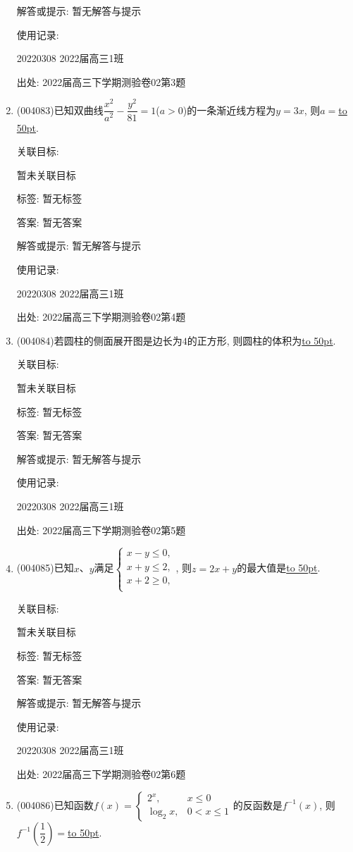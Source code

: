 \documentclass[10pt,a4paper]{article}
\newcommand{\blank}[1]{\underline{\hbox to #1pt{}}}
\begin{document}
\begin{enumerate}[1.]
解答或提示: 暂无解答与提示

使用记录:

20220308	2022届高三1班	


出处: 2022届高三下学期测验卷02第3题
\item { (004083)}已知双曲线$\dfrac{x^2}{a^2}-\dfrac{y^2}{81}=1$($a>0$)的一条渐近线方程为$y=3x$, 则$a=$\blank{50}.


关联目标:

暂未关联目标



标签: 暂无标签

答案: 暂无答案

解答或提示: 暂无解答与提示

使用记录:

20220308	2022届高三1班	


出处: 2022届高三下学期测验卷02第4题
\item { (004084)}若圆柱的侧面展开图是边长为$4$的正方形, 则圆柱的体积为\blank{50}.


关联目标:

暂未关联目标



标签: 暂无标签

答案: 暂无答案

解答或提示: 暂无解答与提示

使用记录:

20220308	2022届高三1班	


出处: 2022届高三下学期测验卷02第5题
\item { (004085)}已知$x$、$y$满足$\begin{cases}  x-y\le 0, \\  x+y\le 2, \\  x+2\ge 0,\\ \end{cases}$, 则$z=2x+y$的最大值是\blank{50}.


关联目标:

暂未关联目标



标签: 暂无标签

答案: 暂无答案

解答或提示: 暂无解答与提示

使用记录:

20220308	2022届高三1班	


出处: 2022届高三下学期测验卷02第6题
\item { (004086)}已知函数$f(x)=\begin{cases} 2^x, & x\le 0 \\  \log_2x, & 0<x\le 1 \end{cases}$的反函数是$f^{-1}(x)$, 则$f^{-1}(\dfrac 12)=$\blank{50}.



\end{enumerate}
\end{document}

